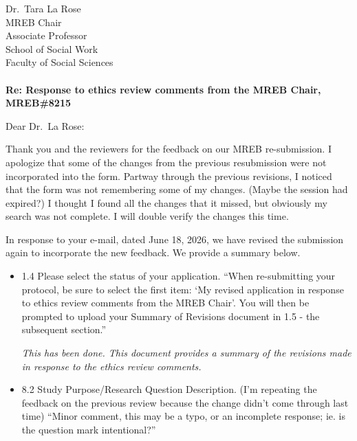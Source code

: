 \documentclass[12pt]{casletter}
\begin{document}
\begin{letter}{~\\
    ~\\
    ~\\
    ~\\
    ~\\
    Dr.\ Tara La Rose\\
    MREB Chair\\
    Associate Professor\\
    School of Social Work\\
    Faculty of Social Sciences\\
    ~\\
    {\bf Re: Response to ethics review comments from the MREB Chair, MREB\#8215}}

\opening {Dear Dr.\ La Rose:}

  Thank you and the reviewers for the feedback on our MREB re-submission.  I
  apologize that some of the changes from the previous resubmission were not
  incorporated into the form.  Partway through the previous revisions, I noticed
  that the form was not remembering some of my changes.  (Maybe the session had
  expired?)  I thought I found all the changes that it missed, but obviously my
  search was not complete.  I will double verify the changes this time.  
  
  In response to your e-mail, dated June 18, 2026, we have revised the
  submission again to incorporate the new feedback.  We provide a summary below.


\begin{itemize}
  
\item 1.4 Please select the status of your application. ``When re-submitting
your protocol, be sure to select the first item: `My revised application in
response to ethics review comments from the MREB Chair'. You will then be
prompted to upload your Summary of Revisions document in 1.5 - the subsequent
section.''\medskip

\emph{This has been done.  This document provides a summary of the revisions
made in response to the ethics review comments.} \smallskip

\item 8.2 Study Purpose/Research Question Description.  (I'm repeating the feedback on the previous review because the change didn't come through last time) ``Minor comment, this
may be a typo, or an incomplete response; ie. is the question mark
intentional?'' \medskip


\end{itemize}
\end{letter}
\end{document}
